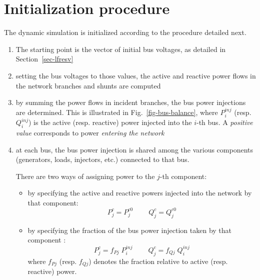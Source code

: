 \section{Initialization procedure}\label{sec-ini-proc}

The dynamic simulation is initialized according to the procedure detailed next.
\begin{enumerate}
\item The starting point is the vector of initial bus voltages, as detailed in Section~\ref{sec-lfresv}
\item setting the bus voltages to those values, the active and reactive power flows in the network branches and shunts are computed
\item by summing the power flows in incident branches, the bus power injections are determined. This is illustrated in Fig.~\ref{fig-bus-balance}, where $P^{inj}_i$ (resp. $Q^{inj}_i$) is the active (resp. reactive) power injected into the $i$-th bus. A \emph{positive value} corresponds to power \emph{entering the network}
\item at each bus, the bus power injection is shared among the various components (generators, loads, injectors, etc.) connected to that bus. 

There are two ways of assigning power to the $j$-th component:
\begin{itemize}
\item[(i)] by specifying the active and reactive powers injected into the network by that component:
\begin{equation}\label{inipower}
P^{c}_j = P^{c0}_j \:\:\:\:\:\:\:\:\:\: Q^{c}_j = Q^{c0}_j
\end{equation}
\item[(ii)] by specifying the fraction of the bus power injection taken by that component :
\begin{equation}\label{frac}
P^{c}_j = f_{Pj} \; P^{inj}_i \:\:\:\:\:\:\:\:\:\: Q^{c}_j = f_{Qj} \; Q^{inj}_i
\end{equation}
where $f_{Pj}$ (resp. $f_{Qj}$) denotes the fraction relative to active (resp. reactive) power.
\end{itemize}


\end{enumerate}

